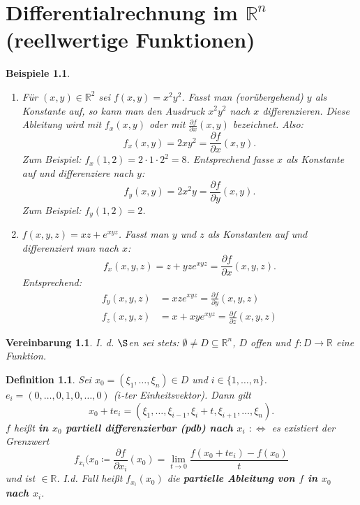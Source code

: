 \documentclass[12pt]{extreport} %
\newcommand{\R}{\mathbb{R}}
\theoremstyle{named}
\theoremstyle{nnamed}
\theoremstyle{itshape}
\newtheorem*{definition}{Definition}
\theoremstyle{normal}
\newtheorem*{beispiele}{Beispiele}
\newtheorem*{vereinbarung}{Vereinbarung}
\begin{document}
\chapter{Differentialrechnung im \texorpdfstring{$\R^{n}$}{Rn} (reellwertige Funktionen)}


\begin{beispiele} ~\
	\begin{enumerate}
		\item Für $(x, y) \in \R^{2}$ sei $f(x, y) = x^{2}y^{2}$. Fasst man (vorübergehend) $y$ als Konstante auf, so kann man den Ausdruck $x^{2}y^{2}$ nach $x$ differenzieren. Diese Ableitung wird mit $f_{x}(x, y)$ oder mit $\frac{\partial f}{\partial x} (x, y)$ bezeichnet. Also:
			$$ f_{x}(x, y) = 2xy^{2} = \frac{\partial f}{\partial x}(x, y). $$
			Zum Beispiel: $f_{x}(1, 2) = 2 \cdot 1 \cdot 2^{2} = 8$. Entsprechend fasse $x$ als Konstante auf und differenziere nach $y$:
			$$ f_{y}(x, y) = 2 x^{2} y = \frac{\partial f}{\partial y}(x, y). $$
			Zum Beispiel: $f_{y}(1, 2) = 2$.
		\item $f(x, y, z) = xz+ e^{xyz}$. Fasst man $y$ und $z$ als Konstanten auf und differenziert man nach $x$:
			$$ f_{x}(x,y,z) = z + yze^{xyz} = \frac{\partial f}{\partial x}(x, y, z). $$
			Entsprechend: 
			\begin{align*}
				f_{y}(x, y, z) &= xze^{xyz} = \frac{\partial f}{\partial y}(x, y, z) \\
				f_{z}(x, y, z) &= x + xye^{xyz} = \frac{\partial f}{\partial z}(x, y, z)
			\end{align*}
	\end{enumerate}	
\end{beispiele}


\begin{vereinbarung}
	I. d. $\S$en sei stets: $\emptyset \neq D \subseteq \R^{n}$, $D$ offen und $f \colon D \rightarrow \R$ eine Funktion.
\end{vereinbarung}

 
\begin{definition} %
	Sei $x_{0} = (\xi_{1}, \dotsc, \xi_{n}) \in D$ und $i \in \{1, \dotsc, n \}$. $e_{i} = (0, \dotsc, 0, 1, 0, \dotsc, 0)$ ($i$-ter Einheitsvektor). Dann gilt
	$$ x_{0} + t e_{i} = (\xi_{1}, \dotsc, \xi_{i-1}, \xi_{i} + t, \xi_{i+1}, \dotsc, \xi_{n}) .$$
	$f$ hei{\ss}t \textbf{in $x_{0}$ partiell differenzierbar (pdb) nach $x_{i}$} $:\iff$ es existiert der Grenzwert
		$$ f_{x_{i}}(x_{0} \coloneqq \frac{\partial f}{\partial x_{i}} (x_{0}) = \lim_{t \rightarrow 0} \frac{f(x_{0} + t e_{i}) - f(x_{0})}{t} $$
	und ist $\in \R$. I.d. Fall hei{\ss}t $f_{x_{i}}(x_{0})$ die \textbf{partielle Ableitung von $f$ in $x_{0}$ nach $x_{i}$}.
\end{definition}
\end{document}
